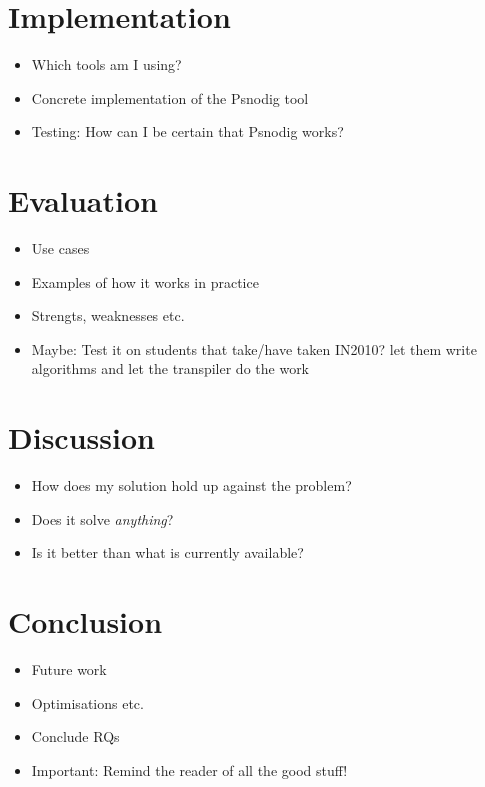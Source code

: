 \documentclass[twoside, openright, a4paper,  UKenglish]{report}
\begin{document}
\chapter{Implementation}
\begin{itemize}
    \item Which tools am I using?
    \item Concrete implementation of the Psnodig tool
    \item Testing: How can I be certain that Psnodig works?
\end{itemize}

\chapter{Evaluation}
\begin{itemize}
    \item Use cases
    \item Examples of how it works in practice
    \item Strengts, weaknesses etc.
    \item Maybe: Test it on students that take/have taken IN2010? let them write algorithms and let the transpiler do the work
\end{itemize}

\chapter{Discussion}
\begin{itemize}
    \item How does my solution hold up against the problem?
    \item Does it solve \textit{anything}?
    \item Is it better than what is currently available?
\end{itemize}

\chapter{Conclusion}
\begin{itemize}
    \item Future work
    \item Optimisations etc.
    \item Conclude RQs
    \item Important: Remind the reader of all the good stuff!
\end{itemize}


\printbibliography
\end{document}

